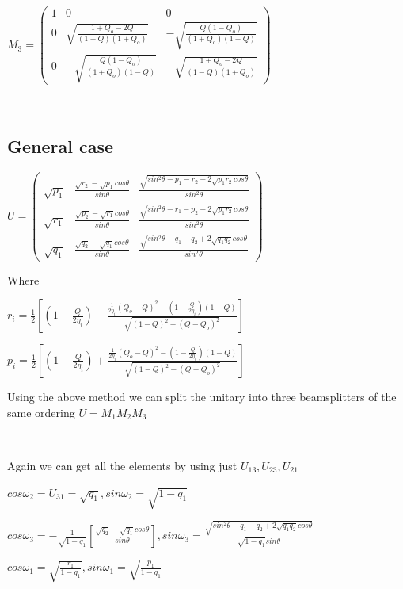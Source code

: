 \documentclass[12pt,oneside,english,reqno]{amsbook}
\numberwithin{section}{chapter}
\numberwithin{equation}{section}
\numberwithin{figure}{section}
\begin{document}
$M_{3}=\begin{pmatrix}1 & 0 & 0\\
0 & \sqrt{\frac{1+Q_{o}-2Q}{(1-Q)(1+Q_{o})}} & -\sqrt{\frac{Q(1-Q_{o})}{(1+Q_{o})(1-Q)}}\\
0 & -\sqrt{\frac{Q(1-Q_{o})}{(1+Q_{o})(1-Q)}} & -\sqrt{\frac{1+Q_{o}-2Q}{(1-Q)(1+Q_{o})}}
\end{pmatrix}$

$ $


\subsection{General case }

$U=\begin{pmatrix}\sqrt{p_{1}} & \frac{\sqrt{r_{2}}-\sqrt{p_{1}}cos\theta}{sin\theta} & \frac{\sqrt{sin^{2}\theta-p_{1}-r_{2}+2\sqrt{p_{1}r_{2}}cos\theta}}{sin^{2}\theta}\\
\sqrt{r_{1}} & \frac{\sqrt{p_{2}}-\sqrt{r_{1}}cos\theta}{sin\theta} & \frac{\sqrt{sin^{2}\theta-r_{1}-p_{2}+2\sqrt{p_{1}r_{2}}cos\theta}}{sin^{2}\theta}\\
\sqrt{q_{1}} & \frac{\sqrt{q_{2}}-\sqrt{q_{1}}cos\theta}{sin\theta} & \frac{\sqrt{sin^{2}\theta-q_{1}-q_{2}+2\sqrt{q_{1}q_{2}}cos\theta}}{sin^{2}\theta}
\end{pmatrix}$

Where

$r_{i}=\frac{1}{2}[(1-\frac{Q}{2\eta_{i}})-\frac{\frac{1}{2\eta_{i}}(Q_{o}-Q)^{2}-(1-\frac{Q}{2\eta_{i}})(1-Q)}{\sqrt{(1-Q)^{2}-(Q-Q_{o})^{2}}}]$ 

$p_{i}=\frac{1}{2}[(1-\frac{Q}{2\eta_{i}})+\frac{\frac{1}{2\eta_{i}}(Q_{o}-Q)^{2}-(1-\frac{Q}{2\eta_{i}})(1-Q)}{\sqrt{(1-Q)^{2}-(Q-Q_{o})^{2}}}]$ 

Using the above method we can split the unitary into three beamsplitters
of the same ordering $U=M_{1}M_{2}M_{3}$

$ $ 

Again we can get all the elements by using just $U_{13},U_{23},U_{21}$ 

$cos\omega_{2}=U_{31}=\sqrt{q_{1}},sin\omega_{2}=\sqrt{1-q_{1}}$ 

$cos\omega_{3}=-\frac{1}{\sqrt{1-q_{1}}}[\frac{\sqrt{q_{2}}-\sqrt{q_{1}}cos\theta}{sin\theta}],sin\omega_{3}=\frac{\sqrt{sin^{2}\theta-q_{1}-q_{2}+2\sqrt{q_{1}q_{2}}cos\theta}}{\sqrt{1-q_{1}}sin\theta}$ 

$cos\omega_{1}=\sqrt{\frac{r_{1}}{1-q_{1}}},sin\omega_{1}=\sqrt{\frac{p_{1}}{1-q_{1}}}$ 
\end{document}
